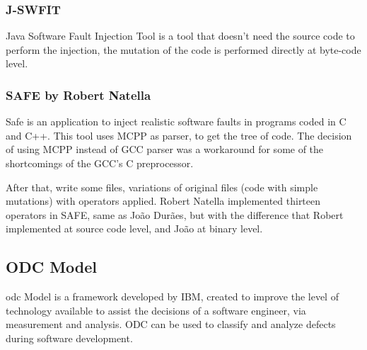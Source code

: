 \subsubsection{J-SWFIT}
\hypertarget{J-SWFIT}{}

Java Software Fault Injection Tool\cite{sanches2011j} is a tool that doesn't need the source code to perform the injection, the mutation of the code is performed directly at byte-code level.\\

\subsubsection{SAFE by Robert Natella}
\hypertarget{SAFE by Robert Natella}{}

Safe is an application to inject realistic software faults in programs coded in C and C++.
This tool uses MCPP as parser, to get the tree of code. The decision of using MCPP instead of GCC parser was a workaround for some of the shortcomings of the GCC's C preprocessor.

After that, write some files, variations of original files (code with simple mutations) with operators applied.
Robert Natella implemented thirteen operators in SAFE, same as João Durães\cite{duraes2006emulation}, but with the difference that Robert implemented at source code level, and João at binary level.\\



\clearpage
\subsection{ODC Model}
\acl{odc}\cite{bridge1998orthogonal} Model is a framework developed by IBM\cite{chillarege2004orthogonal}, created to improve the level of technology available to assist the decisions of a software engineer, via measurement and analysis.
ODC can be used to classify and analyze defects during software development.

